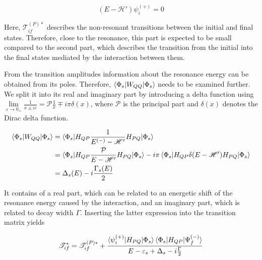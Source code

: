 \begin{equation}                                                              
  (E - \mathscr{H}') \psi_i^{(+)} = 0
\end{equation}

Here, $\mathscr{T}_{if}^{(P)*}$ describes the non-resonant transitions
between the initial and final states. Therefore, close to   
the resonance, this part is expected to be small compared to the second part, which
describes the transition
from the initial into the final states mediated by the interaction between them.

From the transition amplitudes information about
the resonance energy can be obtained from its poles. Therefore,
$\braket{\Phi_s|W_{QQ}|\Phi_s}$ needs to be examined further.
We split it into
its real and imaginary part by introducing a delta function using 
$\lim\limits_{\varepsilon \to 0_+} \frac{1}{x \pm i\varepsilon}
 = \mathscr{P} \frac 1x \mp i\pi\delta(x)$,
where $\mathscr{P}$ is the principal part and $\delta(x)$ denotes the
Dirac delta function. \cite{Cohen-Tannoudji_3_2}

\begin{align}
  \braket{\Phi_s|W_{QQ}|\Phi_s} %
                                & = \braket{\Phi_s|H_{QP}
                                    \frac{1}{E^{(-)} - \mathscr{H}'}H_{PQ}|\Phi_s}\\
                                & = \braket{\Phi_s|H_{QP}
                                    \frac{\mathcal{P}}{E - \mathscr{H}'}H_{PQ}|\Phi_s}
                                    - i\pi \braket{\Phi_s|H_{QP}\delta(E-\mathscr{H}')H_{PQ}
                                    |\Phi_s} \\
                                & = \Delta_s(E) - i \frac{\Gamma_s(E)}{2}
\end{align}

It contains of a real part, which can be related to an energetic shift
of the resonance energy caused by the interaction, and an imaginary part,
which is related to decay width $\Gamma$.
Inserting the latter expression into the transition matrix yields

\begin{equation}
  \mathscr{T}_{if}^* = \mathscr{T}_{if}^{(P)*} + 
                     \frac{\braket{\psi_i^{(+)}|H_{PQ}|\Phi_s}
                           \braket{\Phi_s|H_{QP}|\Psi_f^{(-)}}}
                          {E-\varepsilon_s + \Delta_s - i \frac{\Gamma}{2}}
\end{equation}

